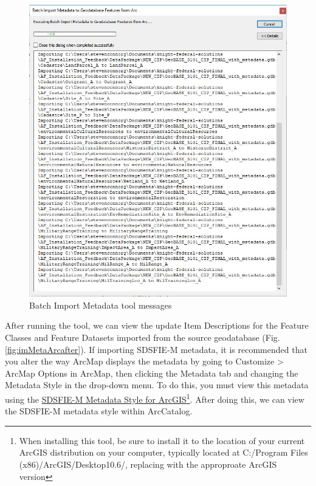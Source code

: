 \documentclass[openany]{book}
\let\rmarkdownfootnote\footnote%
\def\footnote{\protect\rmarkdownfootnote}
\theoremstyle{definition}
\theoremstyle{definition}
\theoremstyle{definition}
\theoremstyle{remark}
\begin{document}
\begin{figure}[H]

{\centering \includegraphics{figures/imMetaArc-messages} 

}

\caption{Batch Import Metadata tool messages}\label{fig:imMetaArcmessages}
\end{figure}

After running the tool, we can view the update Item Descriptions for the
Feature Classes and Feature Datasets imported from the source
geodatabase (Fig. \ref{fig:imMetaArcafter}). If importing SDSFIE-M
metadata, it is recommended that you alter the way ArcMap displays the
metadata by going to Customize \textgreater{} ArcMap Options in ArcMap,
then clicking the Metadata tab and changing the Metadata Style in the
drop-down menu. To do this, you must view this metadata using the
\href{https://www.sdsfieonline.org/Standards/Metadata}{SDSFIE-M Metadata
Style for ArcGIS}\footnote{When installing this tool, be sure to install
  it to the location of your current ArcGIS distribution on your
  computer, typically located at C:/Program Files
  (x86)/ArcGIS/Desktop10.6/, replacing with the approproate ArcGIS
  version}. After doing this, we can view the SDSFIE-M metadata style
within ArcCatalog.
\end{document}
